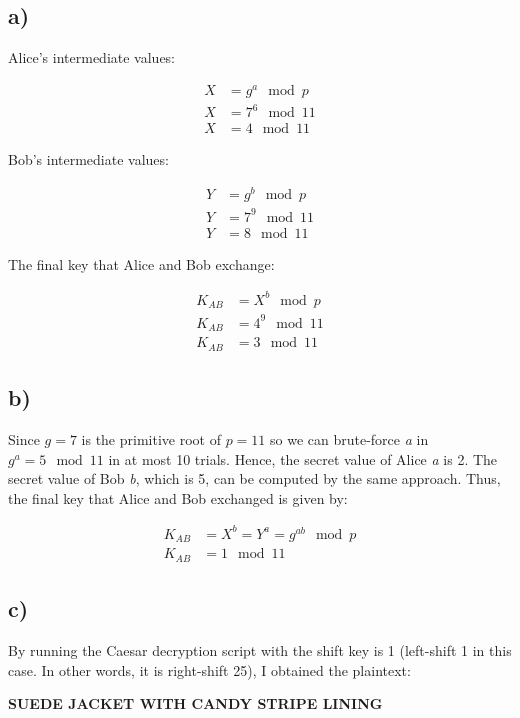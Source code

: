 \subsection*{a)}
Alice's intermediate values:

\begin{align*}
    X &= g^{a} \mod p\\
    X &= 7^6 \mod 11\\
    X &= 4 \mod 11
\end{align*}

Bob's intermediate values:

\begin{align*}
    Y &= g^{b} \mod p\\
    Y &= 7^9 \mod 11\\
    Y &= 8 \mod 11
\end{align*}

The final key that Alice and Bob exchange:

\begin{align*}
    K_{AB} &= X^b \mod p\\
    K_{AB} &= 4^9 \mod 11\\
    K_{AB} &= 3 \mod 11
\end{align*}

\subsection*{b)}
Since \(g=7\) is the primitive root of \(p=11\) so we can brute-force
\emph{a} in \(g^a = 5 \mod 11\) in at most 10 trials. Hence, the secret
value of Alice \emph{a} is 2. The secret value of Bob \emph{b}, which is 5, can be
computed by the same approach. Thus, the final key that Alice and Bob exchanged
is given by:

\begin{align*}
    K_{AB} &= X^b = Y^a = g^{ab} \mod p\\
    K_{AB} &= 1 \mod 11 
\end{align*}

\subsection*{c)}
By running the Caesar decryption script with the shift key is 1 (left-shift 1
in this case. In other words, it is right-shift 25), I obtained the plaintext:

\begin{center}
    \textbf{SUEDE JACKET WITH CANDY STRIPE LINING}
\end{center}
